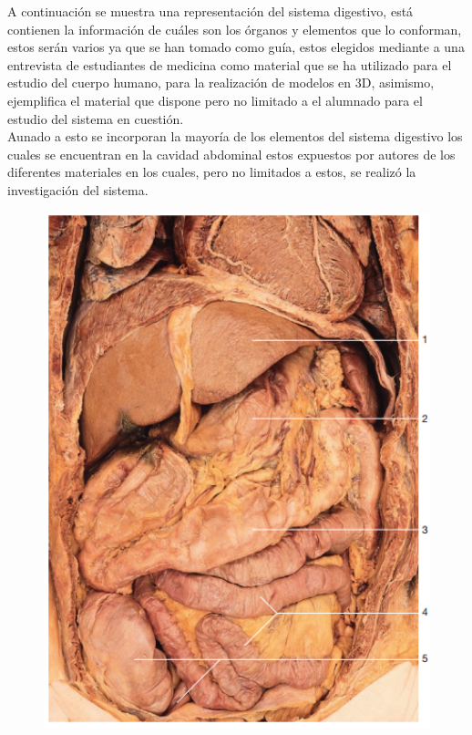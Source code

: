 A continuación se muestra una representación del sistema digestivo, está contienen la información de cuáles son los órganos y elementos que lo conforman, estos serán varios ya que se han tomado como guía, estos elegidos mediante a una entrevista de estudiantes de medicina como material que se ha utilizado para el estudio del cuerpo humano, para la realización de modelos en 3D, asimismo, ejemplifica el material que dispone pero no limitado a el alumnado para el estudio del sistema en cuestión.\\
Aunado a esto se incorporan la mayoría de los elementos del sistema digestivo los cuales se encuentran en la cavidad abdominal estos expuestos por autores de los diferentes materiales en los cuales, pero no limitados a estos, se realizó la investigación del sistema.\\
\begin{figure}[H]
	\begin{center}
 		\includegraphics[width = 1\textwidth]{source/images/image72.png}
	\end{center} 
\end{figure}
